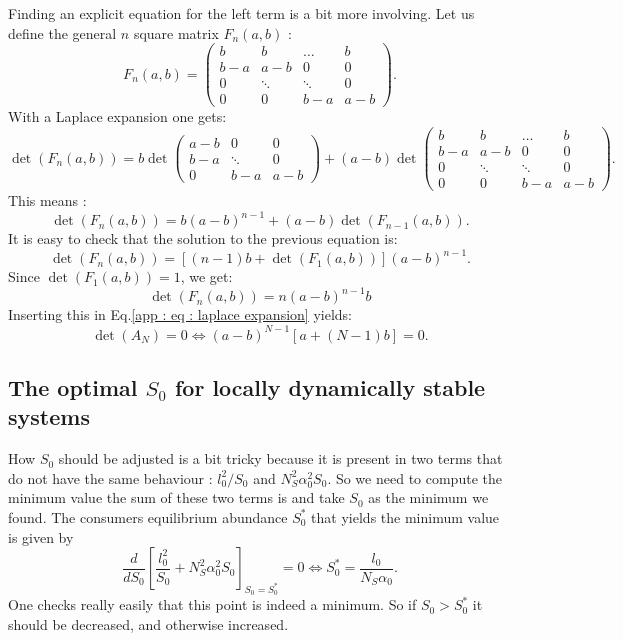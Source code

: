 \documentclass[12pt]{report}
\begin{document}
Finding an explicit equation for the left term is a bit more involving. Let us define the general $n$ square matrix $F_n(a,b)$ :
\begin{equation}
F_n(a,b) = \begin{pmatrix}
b & b & \dots & b \\
b-a & a-b & 0 & 0 \\
0 & \ddots & \ddots & 0 \\
0 & 0 & b-a & a-b
\end{pmatrix}.
\end{equation}
With a Laplace expansion one gets:
\begin{equation}
\det\left(F_n(a,b)\right)= b
\det\begin{pmatrix}
a-b & 0 & 0 \\
b-a & \ddots & 0 \\
0 & b-a & a-b
\end{pmatrix}+(a-b)\det\begin{pmatrix}
b & b & \dots & b \\
b-a & a-b & 0 & 0 \\
0 & \ddots & \ddots & 0 \\
0 & 0 & b-a & a-b
\end{pmatrix}.
\end{equation}
This means :
\begin{equation}
\det(F_n(a,b))=b(a-b)^{n-1}+(a-b)\det(F_{n-1}(a,b)).
\end{equation}
It is easy to check that the solution to the previous equation is:
\begin{equation}
\det(F_n(a,b))=\left[(n-1)b+\det\left(F_1(a,b)\right)\right](a-b)^{n-1}.
\end{equation}
Since $\det\left(F_1(a,b)\right)=1$, we get:
\begin{equation}
\det\left(F_n(a,b)\right)=n(a-b)^{n-1}b
\end{equation}
Inserting this in Eq.\eqref{app : eq : laplace expansion} yields:
\begin{equation}
\boxed{
\det(A_N)=0 \iff (a-b)^{N-1}\left[a+(N-1)b\right]=0.
}\label{eq : formula special determinant}
\end{equation}
\subsection{The optimal $S_0$ for locally dynamically stable systems} \label{sec : appendix how to handle S0}
How $S_0$ should be adjusted is a bit tricky because it is present in two terms that do not have the same behaviour : $l_0^2/S_0$ and $N_S^2 \alpha_0^2 S_0$. So we need to compute the minimum value the sum of these two terms is and take $S_0$ as the minimum we found. The consumers equilibrium abundance $S_0^*$ that yields the minimum value is given by
\begin{equation}
\frac{d}{dS_0} \left[\frac{l_0^2}{S_0}+N_S^2\alpha_0^2 S_0\right]_{S_0=S_0^*}=0 \iff S_0^* = \frac{l_0}{N_S \alpha_0}.
\end{equation}
One checks really easily that this point is indeed a minimum. So if $S_0 > S_0^*$ it should be decreased, and otherwise increased.
\end{document}
